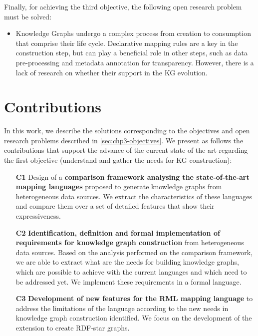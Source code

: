 Finally, for achieving the third objective, the following open research problem must be solved:

\begin{itemize}
    \item Knowledge Graphs undergo a complex process from creation to consumption that comprise their life cycle. Declarative mapping rules are a key in the construction step, but can play a beneficial role in other steps, such as data pre-processing and metadata annotation for transparency. However, there is a lack of research on whether their support in the KG evolution.
\end{itemize}

\section{Contributions}
\label{sec:chp3-contributions}

In this work, we describe the solutions corresponding to the objectives and open research problems described in \cref{sec:chp3-objectives}. We present as follows the contributions that support the advance of the current state of the art regarding the first objective (understand and gather the needs for KG construction): 

\begin{enumerate}
    \item[\textbf{C1}] Design of a \textbf{comparison framework analysing the state-of-the-art mapping languages} proposed to generate knowledge graphs from heterogeneous data sources. We extract the characteristics of these languages and compare them over a set of detailed features that show their expressiveness. 
    
    \item[\textbf{C2}] \textbf{Identification, definition and formal implementation of requirements for knowledge graph construction} from heterogeneous data sources. Based on the analysis performed on the comparison framework, we are able to extract what are the needs for building knowledge graphs, which are possible to achieve with the current languages and which need to be addressed yet. We implement these requirements in a formal language. 
    
    \item[\textbf{C3}] \textbf{Development of new features for the RML mapping language} to address the limitations of the language according to the new needs in knowledge graph construction identified. We focus on the development of the extension to create RDF-star graphs. 
\end{enumerate}

